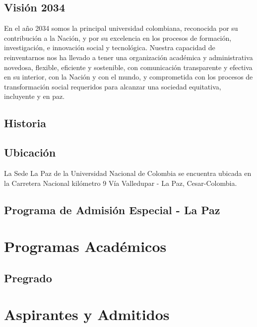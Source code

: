 \documentclass[
]{book}
\begin{document}
\hypertarget{vision}{%
\section*{Visión 2034}\label{vision}}

En el año 2034 somos la principal universidad colombiana, reconocida por su contribución a la Nación, y por su excelencia en los procesos de formación, investigación, e innovación social y tecnológica. Nuestra capacidad de reinventarnos nos ha llevado a tener una organización académica y administrativa novedosa, flexible, eficiente y sostenible, con comunicación transparente y efectiva en su interior, con la Nación y con el mundo, y comprometida con los procesos de transformación social requeridos para alcanzar una sociedad equitativa, incluyente y en paz.

\hypertarget{hist}{%
\section*{Historia}\label{hist}}

\hypertarget{ubica}{%
\section*{Ubicación}\label{ubica}}

La Sede La Paz de la Universidad Nacional de Colombia se encuentra ubicada en la Carretera Nacional kilómetro 9 Vía Valledupar - La Paz, Cesar-Colombia.

\hypertarget{paespaz}{%
\section*{Programa de Admisión Especial - La Paz}\label{paespaz}}

\hypertarget{Prog}{%
\chapter{Programas Académicos}\label{Prog}}

\hypertarget{pregrado}{%
\section{Pregrado}\label{pregrado}}

\hypertarget{Aspirantes}{%
\chapter{Aspirantes y Admitidos}\label{Aspirantes}}
\end{document}
